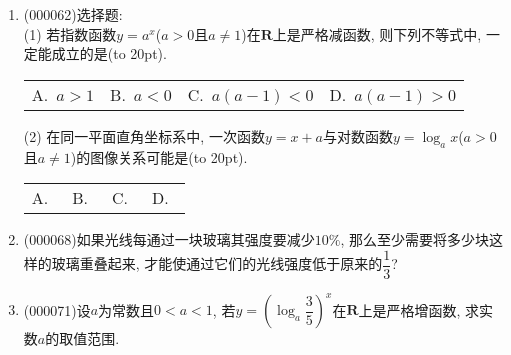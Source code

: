 \documentclass[10pt,a4paper]{article}
\newcommand{\bracket}[1]{(\hbox to #1pt{})}
\newcommand{\fourch}[4]{\par\begin{tabular}{p{.23\textwidth}p{.23\textwidth}p{.23\textwidth}p{.23\textwidth}}
A.~#1 &B.~#2& C.~#3& D.~#4
\end{tabular}}
\begin{document}
\begin{enumerate}[1.]

\item {\tiny (000062)}选择题:\\
(1) 若指数函数$y=a^x$($a>0$且$a\ne 1$)在$\mathbf{R}$上是严格减函数, 则下列不等式中, 一定能成立的是\bracket{20}.
\fourch{$a>1$}{$a<0$}{$a(a-1)<0$}{$a(a-1)>0$}
(2) 在同一平面直角坐标系中, 一次函数$y=x+a$与对数函数$y=\log_ax$($a>0$且$a\ne 1$)的图像关系可能是\bracket{20}.
\fourch{\begin{tikzpicture}[scale = 0.5,>=latex]
    \draw [->] (-2,0) -- (3,0) node [below] {$x$};
    \draw [->] (0,-2) -- (0,3) node [left] {$y$};
    \draw (0,0) node [below left] {$O$};
    \draw (0.1,1) -- (0,1) node [left] {$1$};
    \draw (1,0) node [below] {$1$};
    \draw [thick] (-2,-0.3) -- (1.3,3);
    \draw [thick,domain =-1.1:2.1,samples = 200] plot ({0.5^\x},\x);
\end{tikzpicture}
}{\begin{tikzpicture}[scale = 0.5,>=latex]
    \draw [->] (-2,0) -- (3,0) node [below] {$x$};
    \draw [->] (0,-2) -- (0,3) node [left] {$y$};
    \draw (0,0) node [below left] {$O$};
    \draw (0.1,1) -- (0,1) node [left] {$1$};
    \draw (1,0) node [below] {$1$};
    \draw [thick] (-2,-1.5) -- (2.5,3);
    \draw [thick,domain =1.5:-1.5,samples = 200] plot ({0.5^\x},-\x);
\end{tikzpicture}
}{\begin{tikzpicture}[scale = 0.5,>=latex]
    \draw [->] (-2,0) -- (3,0) node [below] {$x$};
    \draw [->] (0,-2) -- (0,3) node [left] {$y$};
    \draw (0,0) node [below left] {$O$};
    \draw (0.1,1) -- (0,1) node [left] {$1$};
    \draw (1,0) node [below] {$1$};
    \draw [thick] (-2,-1.5) -- (2.5,3);
    \draw [thick,domain =-1.1:2.1,samples = 200] plot ({0.5^\x},\x);
\end{tikzpicture}
}{\begin{tikzpicture}[scale = 0.5,>=latex]
    \draw [->] (-2,0) -- (3,0) node [below] {$x$};
    \draw [->] (0,-2) -- (0,3) node [left] {$y$};
    \draw (0,0) node [below left] {$O$};
    \draw (0.1,1) -- (0,1) node [left] {$1$};
    \draw (1,0) node [below] {$1$};
    \draw [thick] (-1.5,-2) -- (3,2.5);
    \draw [thick,domain =1.5:-1.5,samples = 200] plot ({0.5^\x},-\x);
\end{tikzpicture}
}
\item {\tiny (000068)}如果光线每通过一块玻璃其强度要减少$10\%$, 那么至少需要将多少块这样的玻璃重叠起来, 才能使通过它们的光线强度低于原来的$\dfrac 13$?
\item {\tiny (000071)}设$a$为常数且$0<a<1$, 若$y=(\log_a \dfrac 35)^x$在$\mathbf{R}$上是严格增函数, 求实数$a$的取值范围.

\end{enumerate}
\end{document}

